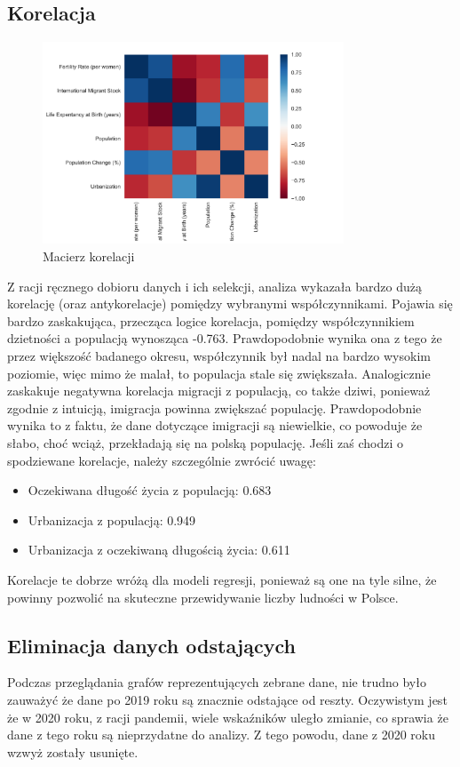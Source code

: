 \documentclass[11pt]{article}
\begin{document}
\subsection{Korelacja}
\begin{figure}[H]
        \centering
        \includegraphics[width=0.8\textwidth]{images/matryca_korelacji.png}
        \caption{Macierz korelacji}
\end{figure}
        Z racji ręcznego dobioru danych i ich selekcji, analiza wykazała bardzo dużą korelację (oraz antykorelacje) pomiędzy wybranymi współczynnikami.
        Pojawia się bardzo zaskakująca, przecząca logice korelacja, pomiędzy współczynnikiem dzietności a populacją wynosząca -0.763.
        Prawdopodobnie wynika ona z tego że przez większość badanego okresu, współczynnik był nadal na bardzo wysokim poziomie, więc mimo że malał, to populacja stale się zwiększała.
        Analogicznie zaskakuje negatywna korelacja migracji z populacją, co także dziwi, ponieważ zgodnie z intuicją, imigracja powinna zwiększać populację.
        Prawdopodobnie wynika to z faktu, że dane dotyczące imigracji są niewielkie, co powoduje że słabo, choć wciąż, przekładają się na polską populację.
        Jeśli zaś chodzi o spodziewane korelacje, należy szczególnie zwrócić uwagę:
        \begin{itemize}
        \item Oczekiwana długość życia z populacją: 0.683
        \item Urbanizacja z populacją: 0.949
        \item Urbanizacja z oczekiwaną długością życia: 0.611
        \end{itemize}
        Korelacje te dobrze wróżą dla modeli regresji, ponieważ są one na tyle silne, że powinny pozwolić na skuteczne przewidywanie liczby ludności w Polsce.
\subsection{Eliminacja danych odstających}
Podczas przeglądania grafów reprezentujących zebrane dane, nie trudno było zauważyć że dane po 2019 roku są znacznie odstające od reszty.
Oczywistym jest że w 2020 roku, z racji pandemii, wiele wskaźników uległo zmianie, co sprawia że dane z tego roku są nieprzydatne do analizy.
Z tego powodu, dane z 2020 roku wzwyż zostały usunięte.
\end{document}
